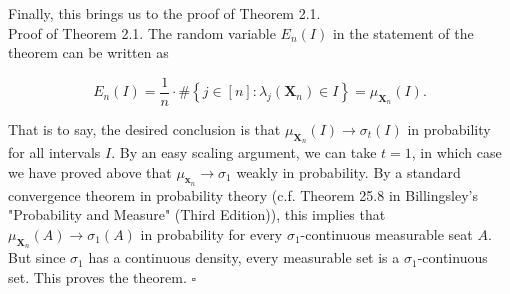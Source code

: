 \documentclass[10pt]{article}
\begin{document}
Finally, this brings us to the proof of Theorem 2.1.\\
Proof of Theorem 2.1. The random variable $E_{n}(I)$ in the statement of the theorem can be written as

$$
E_{n}(I)=\frac{1}{n} \cdot \#\left\{j \in[n]: \lambda_{j}\left(\mathbf{X}_{n}\right) \in I\right\}=\mu_{\mathbf{X}_{n}}(I) .
$$

That is to say, the desired conclusion is that $\mu_{\mathbf{X}_{n}}(I) \rightarrow \sigma_{t}(I)$ in probability for all intervals $I$. By an easy scaling argument, we can take $t=1$, in which case we have proved above that $\mu_{\mathbf{x}_{n}} \rightarrow \sigma_{1}$ weakly in probability. By a standard convergence theorem in probability theory (c.f. Theorem 25.8 in Billingsley's "Probability and Measure" (Third Edition)), this implies that $\mu_{\mathbf{X}_{n}}(A) \rightarrow \sigma_{1}(A)$ in probability for every $\sigma_{1}$-continuous measurable seat $A$. But since $\sigma_{1}$ has a continuous density, every measurable set is a $\sigma_{1}$-continuous set. This proves the theorem. \(\square\)
\end{document}
